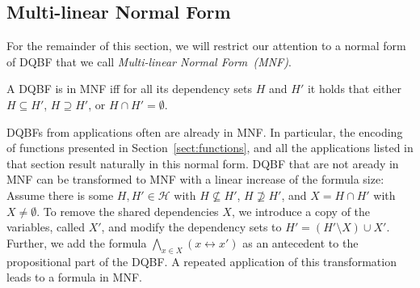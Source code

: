 \documentclass{svjour3}
\newcommand{\set}[1]{{\{#1\}}}
\newcommand{\tuple}[1]{{\langle#1\rangle}}
\newcommand{\dep}{\mathit{dep}}
\begin{document}


\subsection{Multi-linear Normal Form}
\label{ssect:MNF}

For the remainder of this section, we will restrict our attention to a normal form of DQBF that we call \emph{Multi-linear Normal Form~(MNF)}.

\begin{definition}
A DQBF is in MNF iff for all its dependency sets $H$ and $H'$ it holds that either $H \subseteq H'$, $H \supseteq H'$, or $H \cap H' = \emptyset$.
\end{definition}

DQBFs from applications often are already in MNF.
In particular, the encoding of functions presented in Section~\ref{sect:functions}, and all the applications listed in that section result naturally in this normal form.
DQBF that are not aready in MNF can be transformed to MNF with a linear increase of the formula size:
Assume there is some $H,H' \in \mathcal{H}$ with $H \nsubseteq H'$, $H \nsupseteq H'$, and $X = H \cap H'$ with $X \neq \emptyset$.
To remove the shared dependencies $X$, we introduce a copy of the variables, called $X'$, and modify the dependency sets to $H' = (H' \setminus X) \cup X'$.
Further, we add the formula $\bigwedge_{x \in X}(x \leftrightarrow x')$ as an antecedent to the propositional part of the DQBF.
A repeated application of this transformation leads to a formula in MNF.
\end{document}
